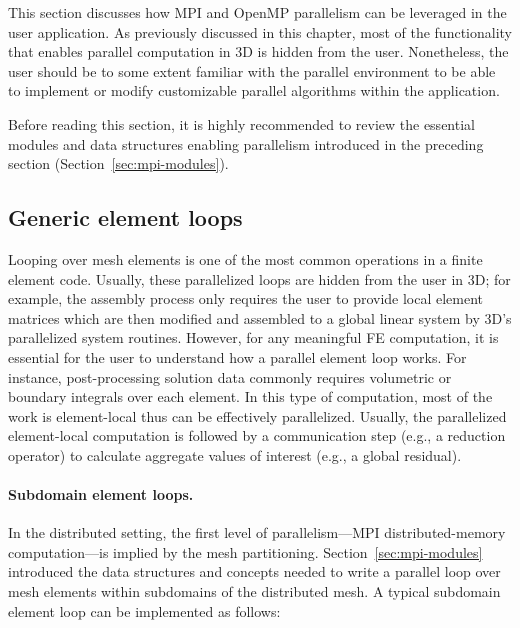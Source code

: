 This section discusses how MPI and OpenMP parallelism can be leveraged in the user application. As previously discussed in this chapter, most of the functionality that enables parallel computation in \hp3D is hidden from the user. Nonetheless, the user should be to some extent familiar with the parallel environment to be able to implement or modify customizable parallel algorithms within the application.

Before reading this section, it is highly recommended to review the essential modules and data structures enabling parallelism introduced in the preceding section (Section~\ref{sec:mpi-modules}).

\subsection{Generic element loops}
\label{sec:generic-element-loops}

Looping over mesh elements is one of the most common operations in a finite element code. Usually, these parallelized loops are hidden from the user in \hp3D; for example, the assembly process only requires the user to provide local element matrices which are then modified and assembled to a global linear system by \hp3D's parallelized system routines. However, for any meaningful FE computation, it is essential for the user to understand how a parallel element loop works. For instance, post-processing solution data commonly requires volumetric or boundary integrals over each element. In this type of computation, most of the work is element-local thus can be effectively parallelized. Usually, the parallelized element-local computation is followed by a communication step (e.g., a reduction operator) to calculate aggregate values of interest (e.g., a global residual).

\paragraph{Subdomain element loops.}
In the distributed setting, the first level of parallelism---MPI distributed-memory computation---is implied by the mesh partitioning. Section~\ref{sec:mpi-modules} introduced the data structures and concepts needed to write a parallel loop over mesh elements within subdomains of the distributed mesh. A typical subdomain element loop can be implemented as follows:

